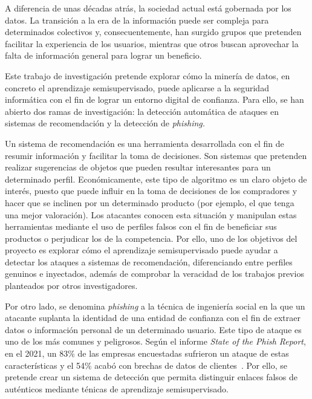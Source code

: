 
A diferencia de unas décadas atrás, la sociedad actual está gobernada por los datos. La transición a la era de la información puede ser compleja para determinados colectivos y, consecuentemente, han surgido grupos que pretenden facilitar la experiencia de los usuarios, mientras que otros buscan aprovechar la falta de información general para lograr un beneficio.

Este trabajo de investigación pretende explorar cómo la minería de datos, en concreto el aprendizaje semisupervisado, puede aplicarse a la seguridad informática con el fin de lograr un entorno digital de confianza. Para ello, se han abierto dos ramas de investigación: la detección automática de ataques en sistemas de recomendación y la detección de \textit{phishing.}

Un sistema de recomendación es una herramienta desarrollada con el fin de resumir información y facilitar la toma de decisiones. Son sistemas que pretenden realizar sugerencias de objetos que pueden resultar interesantes para un determinado perfil. Económicamente, este tipo de algoritmo es un claro objeto de interés, puesto que puede influir en la toma de decisiones de los compradores y hacer que se inclinen por un determinado producto (por ejemplo, el que tenga una mejor valoración). Los atacantes conocen esta situación y manipulan estas herramientas mediante el uso de perfiles falsos con el fin de beneficiar sus productos o perjudicar los de la competencia. Por ello, uno de los objetivos del proyecto es explorar cómo el aprendizaje semisupervisado puede ayudar a detectar los ataques a sistemas de recomendación, diferenciando entre perfiles genuinos e inyectados, además de comprobar la veracidad de los trabajos previos planteados por otros investigadores.

Por otro lado, se denomina \textit{phishing} a la técnica de ingeniería social en la que un atacante suplanta la identidad de una entidad de confianza con el fin de extraer datos o información personal de un determinado usuario. Este tipo de ataque es uno de los más comunes y peligrosos. Según el informe \textit{State of the Phish Report}, en el 2021, un 83\% de las empresas encuestadas sufrieron un ataque de estas características y el 54\% acabó con brechas de datos de clientes~\cite{phishingPorcentajeExito}. Por ello, se pretende crear un sistema de detección que permita distinguir enlaces falsos de auténticos mediante ténicas de aprendizaje semisupervisado.

